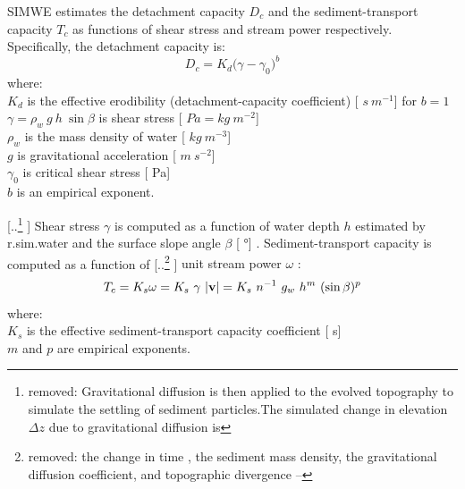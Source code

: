 \documentclass[gmd, manuscript]{copernicus}
\providecommand{\DIFadd}[1]{{\protect\color{blue} \sf #1}} %
\providecommand{\DIFdel}[1]{{\protect\color{red} [..\footnote{removed: #1} ]}} %
\providecommand{\DIFaddbegin}{} %
\providecommand{\DIFaddend}{} %
\providecommand{\DIFdelbegin}{} %
\providecommand{\DIFdelend}{} %
\begin{document}
\DIFaddbegin \DIFadd{SIMWE estimates the detachment capacity $D_c $ and 
the sediment-transport capacity $T_c $ 
as functions of shear stress and stream power respectively. 
Specifically,  the detachment capacity is:
}\begin{equation}
\label{eq:detach_cap}
D_c =K_d  \bigl(\gamma - \gamma_0 \bigr)^b  
\end{equation}
{\DIFadd{\small
\noindent
where: }\\
\DIFadd{\noindent
\hspace*{0.5em} $K_d$ is the effective erodibility 
(detachment-capacity coefficient) }[\DIFadd{$\unit{s~m^{-1}}$}] \DIFadd{for $b=1$}\\ %
\DIFadd{\hspace*{0.5em} $\gamma=\rho_w~g~h~\sin \beta$ is shear stress }[\DIFadd{$\unit{Pa=kg~m^{-2}}$}] \\
\DIFadd{\hspace*{0.5em} $\rho_w$ is the mass density of water }[\DIFadd{$\unit{kg~m^{-3}}$}] \\
\DIFadd{\hspace*{0.5em} $g$ is gravitational acceleration }[\DIFadd{$\unit{m~s^{-2}}$}]\\
\DIFadd{\hspace*{0.5em} $\gamma_0$ is critical shear stress }[\DIFadd{Pa}] \\
\DIFadd{\hspace*{0.5em} $b$ is an empirical exponent.
}}
\DIFaddend 

\noindent
\DIFdelbegin \DIFdel{Gravitational diffusion is then applied to the evolved topography
to simulate the settling of sediment particles.The simulated change in elevation $\Delta z$ %
due to gravitational diffusion 
is }\DIFdelend \DIFaddbegin \DIFadd{Shear stress $\gamma $ is computed
as a function of water depth $h$ estimated by r.sim.water
and the surface slope angle $\beta$ }[\DIFadd{$\unit{\degree}$}]\DIFadd{.
Sediment-transport capacity is computed as }\DIFaddend a function 
of \DIFdelbegin \DIFdel{the change in time , the sediment mass density, 
the gravitational diffusion coefficient, and topographic divergence 
-- }\DIFdelend \DIFaddbegin \DIFadd{unit stream power $\omega$ \citep{Moore1986}:
}\smallskip
\begin{equation}
\label{eq:tc_streampower}
T_c =K_s \omega = K_s~\gamma~|{\bf v}| =
K_s~n^{-1}~g_w~h^m~(\sin \beta)^p
\end{equation}
{\DIFadd{\small
\noindent
where: }\\
\DIFadd{\noindent
\hspace*{0.5em} $K_s$ is the effective sediment-transport capacity coefficient }[\DIFadd{s}] \\
\DIFadd{\hspace*{0.5em} $m$ and $p$ are empirical exponents.
}}
\end{document}
